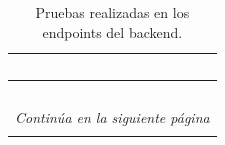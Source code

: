 \begin{longtable}{|p{5cm}|p{9cm}|}
  \caption{Pruebas realizadas en los endpoints del backend.} \label{tab:pruebas_route_handlers}                                                    \\

  \hline
  \rowcolor[HTML]{E6B8CE}
  \textbf{\textcolor{white}{Endpoint}}                  & \textbf{\textcolor{white}{Test}}                                                         \\ \hline
  \endfirsthead

  \hline
  \rowcolor[HTML]{E6B8CE}
  \textbf{\textcolor{white}{Endpoint}}                  & \textbf{\textcolor{white}{Test}}                                                         \\ \hline
  \endhead

  \hline \multicolumn{2}{|r|}{\textit{Continúa en la siguiente página}}                                                                            \\ \hline
  \endfoot

  \hline
  \endlastfoot


\end{longtable}

